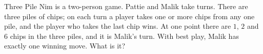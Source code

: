Three Pile Nim is a two-person game. Pattie and Malik take turns. There are three piles of chips; on each turn a player takes one or more chips from any one pile, and the player who takes the last chip wins. At one point there are $1$, $2$ and $6$ chips in the three piles, and it is Malik's turn. With best play, Malik has exactly one winning move. What is it?
